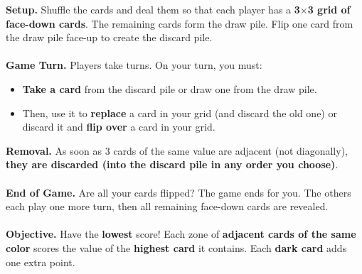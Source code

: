 \documentclass[a4paper]{memoir}
\begin{document}
{\footnotesize

\noindent
\textbf{ Setup.} Shuffle the cards and deal them so that each player has a \textbf{3$\times$3 grid of face-down cards}. 
The remaining cards form the draw pile. Flip one card from the draw pile face-up to create the discard pile.
\\
\\
\textbf{ Game Turn.} Players take turns. On your turn, you must:
\begin{itemize}
    \item \textbf{Take a card} from the discard pile or draw one from the draw pile.
    \item Then, use it to \textbf{replace} a card in your grid (and discard the old one) or discard it and \textbf{flip over} a card in your grid.
\end{itemize}
\textbf{ Removal.} As soon as 3 cards of the same value are adjacent (not diagonally), \textbf{they are discarded (into the discard pile in any order you choose)}.
\\
\\
\textbf{ End of Game.} Are all your cards flipped? The game ends for you. 
The others each play one more turn, then all remaining face-down cards are revealed.
\\
\\
\textbf{ Objective.} Have the \textbf{lowest} score! 
Each zone of \textbf{adjacent cards of the same color} scores the value of the \textbf{highest card} it contains.
Each \textbf{dark card} adds one extra point.
}
\end{document}
